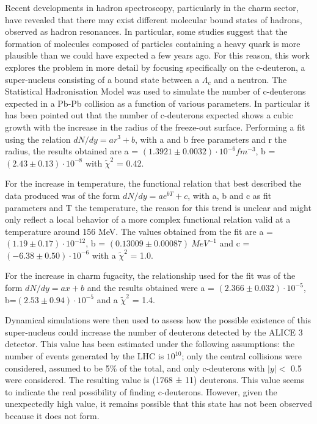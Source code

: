 \documentclass[12pt,a4paper]{book}
\begin{document}
	Recent developments in hadron spectroscopy, particularly in the charm sector, have revealed that there may exist different molecular bound states of hadrons, observed as hadron resonances. In particular, some studies suggest that the formation of molecules composed of particles containing a heavy quark is more plausible than we could have expected a few years ago. 
	For this reason, this work explores the problem in more detail by focusing specifically on the c-deuteron, a super-nucleus consisting of a bound state between a $\Lambda_c$ and a neutron. The Statistical Hadronisation Model was used to simulate the number of c-deuterons expected in a Pb-Pb collision as a function of various parameters. In particular it has been pointed out that the number of c-deuterons expected shows a cubic growth with the increase in the radius of the freeze-out surface. Performing a fit using the relation $dN/dy= ar^3+b$, with a and b free parameters and r the radius, the results obtained are a = $(1.3921 \pm 0.0032) \cdot 10^{-6} fm^{-3}$, b = $(2.43 \pm 0.13)\cdot 10^{-8}$ with $\tilde{\chi}^2$ = 0.42.
	
	 For the increase in temperature, the functional relation that best described the data produced was of the form $dN/dy= ae^{bT} + c$, with a, b and c as fit parameters and T the temperature, the reason for this trend is unclear and might only reflect a local behavior of a more complex functional relation valid at a temperature around 156 MeV. The values obtained from the fit are a = $(1.19 \pm 0.17) \cdot 10^{-12}$, b = $(0.13009 \pm 0.00087)\ MeV^{-1}$ and c = $(-6.38 \pm 0.50)\cdot 10^{-6}$ with a $\tilde{\chi}^2$  = 1.0.
	 
	 For the increase in charm fugacity, the relationship used for the fit was of the form $dN/dy=ax+b$ and the results obtained were a = $(2.366 \pm 0.032)\cdot 10^{-5}$, b=$(2.53\pm0.94)\cdot 10^{-5}$ and a $\tilde{\chi}^2$ = 1.4.
	
	Dynamical simulations were then used to assess how the possible existence of this super-nucleus could increase the number of deuterons detected by the ALICE 3 detector. This value has been estimated under the following assumptions: the number of events generated by the LHC is $10^{10}$; only the central collisions were considered, assumed to be 5\% of the total, and only c-deuterons with $|y|<$ 0.5 were considered. The resulting value is (1768 ± 11) deuterons. This value seems to indicate the real possibility of finding c-deuterons.  However, given the unexpectedly high value, it remains possible that this state has not been observed because it does not form.
	
\end{document}
